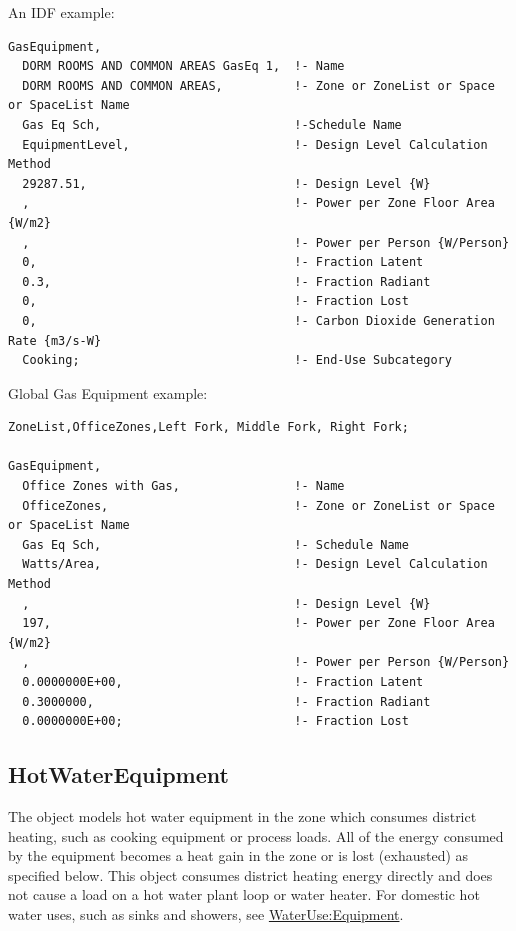 An IDF example:

\begin{lstlisting}
GasEquipment,
  DORM ROOMS AND COMMON AREAS GasEq 1,  !- Name
  DORM ROOMS AND COMMON AREAS,          !- Zone or ZoneList or Space or SpaceList Name
  Gas Eq Sch,                           !-Schedule Name
  EquipmentLevel,                       !- Design Level Calculation Method
  29287.51,                             !- Design Level {W}
  ,                                     !- Power per Zone Floor Area {W/m2}
  ,                                     !- Power per Person {W/Person}
  0,                                    !- Fraction Latent
  0.3,                                  !- Fraction Radiant
  0,                                    !- Fraction Lost
  0,                                    !- Carbon Dioxide Generation Rate {m3/s-W}
  Cooking;                              !- End-Use Subcategory
\end{lstlisting}

Global Gas Equipment example:

\begin{lstlisting}
ZoneList,OfficeZones,Left Fork, Middle Fork, Right Fork;

GasEquipment,
  Office Zones with Gas,                !- Name
  OfficeZones,                          !- Zone or ZoneList or Space or SpaceList Name
  Gas Eq Sch,                           !- Schedule Name
  Watts/Area,                           !- Design Level Calculation Method
  ,                                     !- Design Level {W}
  197,                                  !- Power per Zone Floor Area {W/m2}
  ,                                     !- Power per Person {W/Person}
  0.0000000E+00,                        !- Fraction Latent
  0.3000000,                            !- Fraction Radiant
  0.0000000E+00;                        !- Fraction Lost
\end{lstlisting}

\subsection{HotWaterEquipment}\label{hotwaterequipment}

The object models hot water equipment in the zone which consumes district heating, such as cooking equipment or process loads. All of the energy consumed by the equipment becomes a heat gain in the zone or is lost (exhausted) as specified below. This object consumes district heating energy directly and does not cause a load on a hot water plant loop or water heater. For domestic hot water uses, such as sinks and showers, see \hyperref[wateruseequipment]{WaterUse:Equipment}.

